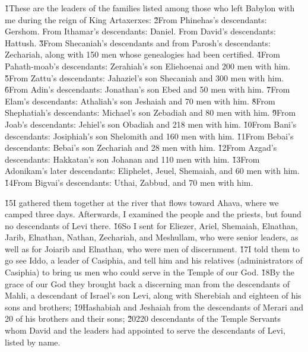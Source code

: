 \v{1}These are the leaders of the families listed among those who left Babylon with me during the reign of King Artaxerxes: \v{2}From Phinehas's descendants: Gershom. From Ithamar's descendants: Daniel. From David's descendants: Hattush. \v{3}From Shecaniah's descendants and from Parosh's descendants: Zechariah, along with 150 men whose genealogies had been certified. \v{4}From Pahath-moab's descendants: Zerahiah's son Eliehoenai and 200 men with him. \v{5}From Zattu's descendants: Jahaziel's son Shecaniah and 300 men with him. \v{6}From Adin's descendants: Jonathan's son Ebed and 50 men with him. \v{7}From Elam's descendants: Athaliah's son Jeshaiah and 70 men with him. \v{8}From Shephatiah's descendants: Michael's son Zebadiah and 80 men with him. \v{9}From Joab's descendants: Jehiel's son Obadiah and 218 men with him. \v{10}From Bani's descendants: Josiphiah's son Shelomith and 160 men with him. \v{11}From Bebai's descendants: Bebai's son Zechariah and 28 men with him. \v{12}From Azgad's descendants: Hakkatan's son Johanan and 110 men with him. \v{13}From Adonikam's later descendants: Eliphelet, Jeuel, Shemaiah, and 60 men with him. \v{14}From Bigvai's descendants: Uthai, Zabbud, and 70 men with him.

\v{15}I gathered them together at the river that flows toward Ahava, where we camped three days. Afterwards, I examined the people and the priests, but found no descendants of Levi there. \v{16}So I sent for Eliezer, Ariel, Shemaiah, Elnathan, Jarib, Elnathan, Nathan, Zechariah, and Meshullam, who were senior leaders, as well as for Joiarib and Elnathan, who were men of discernment. \v{17}I told them to go see Iddo, a leader of Casiphia, and tell him and his relatives (administrators of Casiphia) to bring us men who could serve in the Temple of our God. \v{18}By the grace of our God they brought back a discerning man from the descendants of Mahli, a descendant of Israel's son Levi, along with Sherebiah and eighteen of his sons and brothers; \v{19}Hashabiah and Jeshaiah from the descendants of Merari and 20 of his brothers and their sons; \v{20}220 descendants of the Temple Servants whom David and the leaders had appointed to serve the descendants of Levi, listed by name.

